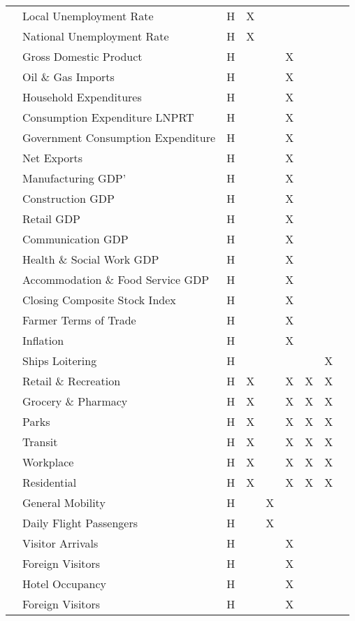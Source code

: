 \begin{center}
\begin{longtable}{|C{1.5cm}|C{2.5cm}|C{0.75cm}|C{1cm}|C{1cm}|C{2cm}|C{1.5cm}|C{1.5cm}|C{1cm}|}
 & Local Unemployment Rate & H & X & & & & \\ 
& National Unemployment Rate & H & X & & & & \\ 
& Gross Domestic Product & H & & & X & & \\ 
& Oil \& Gas Imports & H & & & X & & \\ 
& Household Expenditures & H & & & X & & \\ 
& Consumption Expenditure LNPRT & H & & & X & & \\ 
& Government Consumption Expenditure & H & & & X & & \\ 
& Net Exports & H & & & X & & \\ 
& Manufacturing GDP' & H & & & X & & \\ 
& Construction GDP & H & & & X & & \\ 
& Retail GDP & H & & & X & & \\ 
& Communication GDP & H & & & X & & \\ 
& Health \& Social Work GDP & H & & & X & & \\ 
& Accommodation \& Food Service GDP & H & & & X & & \\ 
& Closing Composite Stock Index & H & & & X & & \\ 
& Farmer Terms of Trade & H & & & X & & \\ 
& Inflation & H & & & X & & \\ 
& Ships Loitering & H & & & & & X \\ \hline

 & Retail \& Recreation & H & X  & & X & X & X \\ 
& Grocery \& Pharmacy & H & X & & X & X & X\\ 
& Parks & H & X  & & X & X & X\\ 
& Transit & H & X  & & X & X & X \\ 
& Workplace & H & X  & & X & X & X\\ 
& Residential & H & X  & & X & X & X\\ 
& General Mobility & H & & X & & & \\ 
& Daily Flight Passengers & H & & X & & & \\ 
& Visitor Arrivals & H & & & X & & \\ 
& Foreign Visitors & H & & & X & & \\ 
& Hotel Occupancy & H & & & X & & \\ 
& Foreign Visitors & H & & & X & & \\ \hline

\end{longtable}
\end{center}